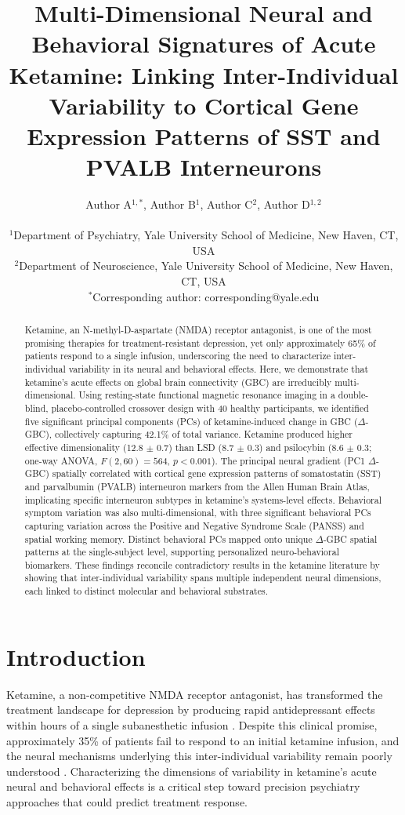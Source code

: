 \documentclass[11pt]{article}
\title{Multi-Dimensional Neural and Behavioral Signatures of Acute Ketamine: Linking Inter-Individual Variability to Cortical Gene Expression Patterns of SST and PVALB Interneurons}
\author{
Author A$^{1,*}$, Author B$^{1}$, Author C$^{2}$, Author D$^{1,2}$ \\
\\
\small $^{1}$Department of Psychiatry, Yale University School of Medicine, New Haven, CT, USA \\
\small $^{2}$Department of Neuroscience, Yale University School of Medicine, New Haven, CT, USA \\
\small $^{*}$Corresponding author: corresponding@yale.edu
}
\date{}
\begin{document}
\maketitle

\begin{abstract}
Ketamine, an N-methyl-D-aspartate (NMDA) receptor antagonist, is one of the most promising therapies for treatment-resistant depression, yet only approximately 65\% of patients respond to a single infusion, underscoring the need to characterize inter-individual variability in its neural and behavioral effects. Here, we demonstrate that ketamine's acute effects on global brain connectivity (GBC) are irreducibly multi-dimensional. Using resting-state functional magnetic resonance imaging in a double-blind, placebo-controlled crossover design with 40 healthy participants, we identified five significant principal components (PCs) of ketamine-induced change in GBC ($\Delta$-GBC), collectively capturing 42.1\% of total variance. Ketamine produced higher effective dimensionality (12.8 $\pm$ 0.7) than LSD (8.7 $\pm$ 0.3) and psilocybin (8.6 $\pm$ 0.3; one-way ANOVA, $F(2,60) = 564$, $p < 0.001$). The principal neural gradient (PC1 $\Delta$-GBC) spatially correlated with cortical gene expression patterns of somatostatin (SST) and parvalbumin (PVALB) interneuron markers from the Allen Human Brain Atlas, implicating specific interneuron subtypes in ketamine's systems-level effects. Behavioral symptom variation was also multi-dimensional, with three significant behavioral PCs capturing variation across the Positive and Negative Syndrome Scale (PANSS) and spatial working memory. Distinct behavioral PCs mapped onto unique $\Delta$-GBC spatial patterns at the single-subject level, supporting personalized neuro-behavioral biomarkers. These findings reconcile contradictory results in the ketamine literature by showing that inter-individual variability spans multiple independent neural dimensions, each linked to distinct molecular and behavioral substrates.
\end{abstract}

\section{Introduction}

Ketamine, a non-competitive NMDA receptor antagonist, has transformed the treatment landscape for depression by producing rapid antidepressant effects within hours of a single subanesthetic infusion \citep{berman2000, zarate2006, murrough2013}. Despite this clinical promise, approximately 35\% of patients fail to respond to an initial ketamine infusion, and the neural mechanisms underlying this inter-individual variability remain poorly understood \citep{duman2016}. Characterizing the dimensions of variability in ketamine's acute neural and behavioral effects is a critical step toward precision psychiatry approaches that could predict treatment response.
\end{document}
